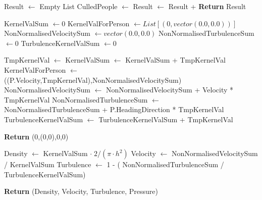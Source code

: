 \begin{center}
\label{alg:revised_algorithm}
\begin{algorithmic}[1]

\State Result $\gets$ Empty List 
    \State CulledPeople $\gets$  
    \State Result $\gets$ Result + 
\EndFor
\State \textbf{Return} Result

\EndFunction



\State KernelValSum $\gets 0$
\State KernelValForPerson $\gets List[(0,vector(0.0,0.0))]$ 
\State NonNormalisedVelocitySum $\gets vector(0.0,0.0)$
\State NonNormalisedTurbulenceSum $\gets 0$
\State TurbulenceKernelValSum $\gets 0$ 


    \State TmpKernelVal $\gets$ 
    \State KernelValSum $\gets$ KernelValSum + TmpKernelVal
    \State KernelValForPerson $\gets$ ((P.Velocity,TmpKernelVal),NonNormalisedVelocitySum)
    \State NonNormalisedVelocitySum $\gets$ NonNormalisedVelocitySum + Velocity * TmpKernelVal
        \State NonNormalisedTurbulenceSum $\gets$ NonNormalisedTurbulenceSum + P.HeadingDirection * TmpKernelVal
        \State TurbulenceKernelValSum $\gets$ TurbulenceKernelValSum + TmpKernelVal
    \EndIf
\EndFor

    \State \textbf{Return} (0,(0,0),0,0)
\EndIf

\State Density $\gets$ KernelValSum $\cdot \; 2 / (\pi \cdot h^2)$
\State Velocity $\gets$ NonNormalisedVelocitySum / KernelValSum
\State Turbulence $\gets$ 1 - ( NonNormalisedTurbulenceSum / TurbulenceKernelValSum)
\State

\State \textbf{Return} (Density, Velocity, Turbulence, Pressure) 

\EndFunction
\end{algorithmic}
\end{center}






